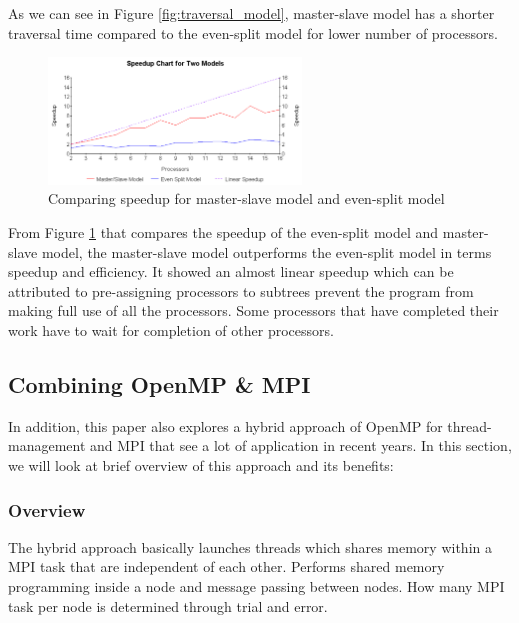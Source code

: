 \documentclass[12pt]{article}
\begin{document}
As we can see in Figure \ref{fig:traversal_model}, master-slave model has a
shorter traversal time compared to the even-split model for lower number of processors.

\begin{figure}[H]
  \centering
  \includegraphics[width=0.6\textwidth, height=0.4\textwidth]{speedup_model.png}
  \caption{Comparing speedup for master-slave model and even-split model}
  \label{fig:speedup_model}
\end{figure}

From Figure \ref{fig:speedup_model} that compares the speedup of the even-split
model and master-slave model, the master-slave model outperforms the even-split
model in terms speedup and efficiency. It showed an almost linear speedup which
can be attributed to pre-assigning processors to subtrees prevent the program
from making full use of all the processors. Some processors that have completed
their work have to wait for completion of other processors.



\subsection{Combining OpenMP \& MPI}

In addition, this paper also explores a hybrid approach of OpenMP for
thread-management and MPI that see a lot of application in recent years. In this
section, we will look at brief overview of this approach and its benefits:

\subsubsection{Overview}

The hybrid approach basically launches threads which shares memory within a MPI
task that are independent of each other. Performs shared memory programming
inside a node and message passing between nodes. How many MPI task per node is
determined through trial and error.
\end{document}
